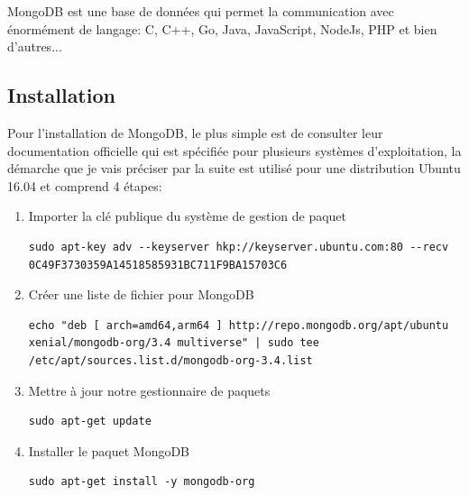 \documentclass[a4paper]{scrreprt}
\begin{document}
MongoDB est une base de données qui permet la communication avec énormément de langage: C, C++, Go, Java, JavaScript, NodeJs, PHP et bien d'autres...
\subsection{Installation}
Pour l'installation de MongoDB, le plus simple est de consulter leur documentation officielle qui est spécifiée pour plusieurs systèmes d'exploitation, la démarche que je vais préciser par la suite est utilisé pour une distribution Ubuntu 16.04 et comprend 4 étapes:

\begin{enumerate}
\item Importer la clé publique du système de gestion de paquet\\
\begin{verbatim}
sudo apt-key adv --keyserver hkp://keyserver.ubuntu.com:80 --recv 0C49F3730359A14518585931BC711F9BA15703C6
\end{verbatim}

\item Créer une liste de fichier pour MongoDB\\
\begin{verbatim}
echo "deb [ arch=amd64,arm64 ] http://repo.mongodb.org/apt/ubuntu xenial/mongodb-org/3.4 multiverse" | sudo tee /etc/apt/sources.list.d/mongodb-org-3.4.list
\end{verbatim}

\item Mettre à jour notre gestionnaire de paquets\\
\begin{verbatim}
sudo apt-get update
\end{verbatim}

\item Installer le paquet MongoDB\\
\begin{verbatim}
sudo apt-get install -y mongodb-org
\end{verbatim}
\end{enumerate}
\end{document}
